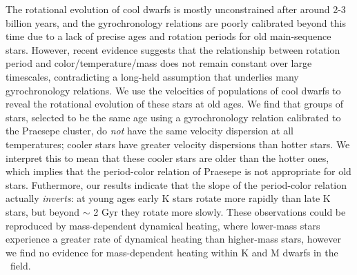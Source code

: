 
The rotational evolution of cool dwarfs is mostly unconstrained after around
2-3 billion years, and the gyrochronology relations are poorly calibrated
beyond this time due to a lack of precise ages and rotation periods for old
main-sequence stars.
However, recent evidence suggests that the relationship between rotation
period and color/temperature/mass does not remain constant over large
timescales, contradicting a long-held assumption that underlies many
gyrochronology relations.
We use the velocities of populations of cool dwarfs to reveal the rotational
evolution of these stars at old ages.
We find that groups of stars, selected to be the same age using a
gyrochronology relation calibrated to the Praesepe cluster, do {\it not} have
the same velocity dispersion at all temperatures; cooler stars have greater
velocity dispersions than hotter stars.
We interpret this to mean that these cooler stars are older than the hotter
ones, which implies that the period-color relation of Praesepe is not
appropriate for old stars.
Futhermore, our results indicate that the slope of the period-color relation
actually {\it inverts}: at young ages early K stars rotate more rapidly than
late K stars, but beyond $\sim$ 2 Gyr they rotate more slowly.
These observations could be reproduced by mass-dependent dynamical heating,
where lower-mass stars experience a greater rate of dynamical heating than
higher-mass stars, however we find no evidence for mass-dependent heating
within K and M dwarfs in the \kepler\ field.

